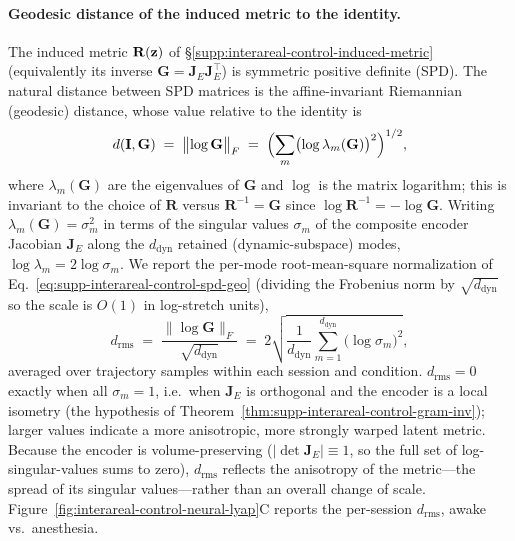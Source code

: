 \paragraph{Geodesic distance of the induced metric to the identity.} The induced metric $\mathbf{R}(\vb{z})$ of \S\ref{supp:interareal-control-induced-metric} (equivalently its inverse $\mathbf{G}=\mathbf{J}_{E}\mathbf{J}_{E}^{\!\top}$) is symmetric positive definite (SPD). The natural distance between SPD matrices is the affine-invariant Riemannian (geodesic) distance, whose value relative to the identity is
\begin{equation}
d(\mathbf{I},\mathbf{G}) \;=\; \bigl\|\log\mathbf{G}\bigr\|_{F} \;=\; \Bigl(\sum_{m}\bigl(\log\lambda_{m}(\mathbf{G})\bigr)^{2}\Bigr)^{1/2},\label{eq:supp-interareal-control-spd-geo}
\end{equation}
where $\lambda_{m}(\mathbf{G})$ are the eigenvalues of $\mathbf{G}$ and $\log$ is the matrix logarithm; this is invariant to the choice of $\mathbf{R}$ versus $\mathbf{R}^{-1}=\mathbf{G}$ since $\log\mathbf{R}^{-1}=-\log\mathbf{G}$. Writing $\lambda_{m}(\mathbf{G})=\sigma_{m}^{2}$ in terms of the singular values $\sigma_{m}$ of the composite encoder Jacobian $\mathbf{J}_{E}$ along the $d_{\mathrm{dyn}}$ retained (dynamic-subspace) modes, $\log\lambda_{m}=2\log\sigma_{m}$. We report the per-mode root-mean-square normalization of Eq.~\ref{eq:supp-interareal-control-spd-geo} (dividing the Frobenius norm by $\sqrt{d_{\mathrm{dyn}}}$ so the scale is $O(1)$ in log-stretch units),
\begin{equation}
d_{\mathrm{rms}} \;=\; \frac{\|\log\mathbf{G}\|_{F}}{\sqrt{d_{\mathrm{dyn}}}} \;=\; 2\sqrt{\frac{1}{d_{\mathrm{dyn}}}\sum_{m=1}^{d_{\mathrm{dyn}}}\bigl(\log\sigma_{m}\bigr)^{2}},
\end{equation}
averaged over trajectory samples within each session and condition. $d_{\mathrm{rms}}=0$ exactly when all $\sigma_{m}=1$, i.e.\ when $\mathbf{J}_{E}$ is orthogonal and the encoder is a local isometry (the hypothesis of Theorem~\ref{thm:supp-interareal-control-gram-inv}); larger values indicate a more anisotropic, more strongly warped latent metric. Because the encoder is volume-preserving ($|\det\mathbf{J}_{E}|\equiv1$, so the full set of log-singular-values sums to zero), $d_{\mathrm{rms}}$ reflects the anisotropy of the metric---the spread of its singular values---rather than an overall change of scale. Figure~\ref{fig:interareal-control-neural-lyap}C reports the per-session $d_{\mathrm{rms}}$, awake vs.\ anesthesia.

